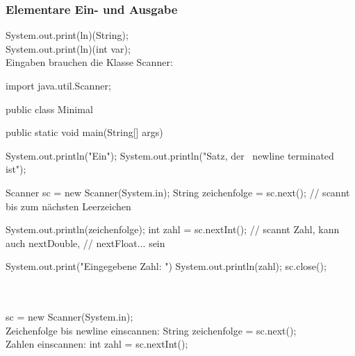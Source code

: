 \documentclass[11pt, a4paper]{article}
\begin{document}
\subsubsection{Elementare Ein- und Ausgabe}
System.out.print(ln)(String);\\System.out.print(ln)(int var);\\Eingaben brauchen die Klasse Scanner:\\
\hspace*{0cm}\hfill
\begin{minipage}[l]{.8\linewidth}
\begin{code}
import java.util.Scanner;

public class Minimal{
	public static void main(String[] args){
		System.out.println("Ein");
		System.out.println("Satz, der \
		newline terminated ist");
		
		Scanner sc = new Scanner(System.in);
		String zeichenfolge = sc.next();
		// scannt bis zum nächsten Leerzeichen
		
		System.out.println(zeichenfolge);
		int zahl = sc.nextInt();
		// scannt Zahl, kann auch nextDouble,
		// nextFloat... sein
		
		System.out.print("Eingegebene Zahl: ")
		System.out.println(zahl);
		sc.close();
	}
}
\end{code}
\end{minipage}
\\\\\Scanner sc = new Scanner(System.in);\\Zeichenfolge bis newline einscannen: String zeichenfolge = sc.next();\\Zahlen einscannen: int zahl = sc.nextInt();
\end{document}
